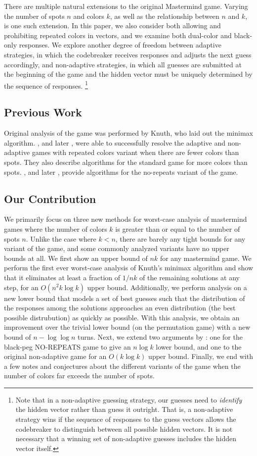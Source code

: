 \documentclass[12pt, a4paper]{article}
\begin{document}
There are multiple natural extensions to the original Mastermind game. Varying the
number of spots $n$ and colors $k$, as well as the relationship between $n$ and $k$,
is one such extension. In this paper, we also consider both allowing and prohibiting
repeated colors in vectors, and we examine both dual-color and black-only responses.
We explore another degree of freedom between adaptive strategies, in which the
codebreaker receives responses and adjusts the next guess accordingly, and non-adaptive
strategies, in which all guesses are submitted at the beginning of the
game and the hidden vector must be uniquely determined by the sequence of responses.
\footnote{Note that in a non-adaptive guessing strategy, our guesses need to
\textit{identify} the hidden vector rather than guess it outright. That is, a
non-adaptive strategy wins if the sequence of responses to the guess vectors allows
the codebreaker to distinguish between all possible hidden vectors. It is not
necessary that a winning set of non-adaptive guesses includes the hidden vector
itself.}

\subsection{Previous Work}
Original analysis of the game was performed by Knuth, who laid out the minimax algorithm. \cite{VC83}, and later \cite{DS13}, were able to successfully resolve the adaptive and non-adaptive games with repeated colors variant when there are fewer colors than spots. They also describe algorithms for the standard game for more colors than spots. \cite{KT86}, and later \cite{OS13}, provide algorithms for the no-repeats variant of the game. 

\subsection{Our Contribution}
We primarily focus on three new methods for worst-case analysis of mastermind games where the number of colors
$k$ is greater than or equal to the number of spots $n$. Unlike the case where $k < n$,
there are barely any tight bounds for any variant of the game, and some commonly analyzed
variants have no upper bounds at all. We first show an upper bound of $nk$ for any mastermind
game. We perform the first ever worst-case analysis of Knuth's minimax algorithm and show
that it eliminates at least a fraction of $1/nk$ of the remaining solutions at any step, for an 
$O(n^2k \log k)$ upper bound. Additionally, we perform analysis on a new lower bound that
models a set of best guesses such that the distribution of the responses among the solutions
approaches an even distribution (the best possible distrubution) as quickly as possible. With this
analysis, we obtain an improvement over the trivial lower bound (on the permutation game) with a new bound of $n- \log \log n$ turns.
Next, we extend two arguments by \cite{DS13}: one for the black-peg NO-REPEATS game to 
give an $n \log k$ lower bound, and one to the original non-adaptive game for an $O(k \log k)$ 
upper bound. Finally, we end with a few notes and conjectures about the different variants of
the game when the number of colors far exceeds the number of spots.
\end{document}
